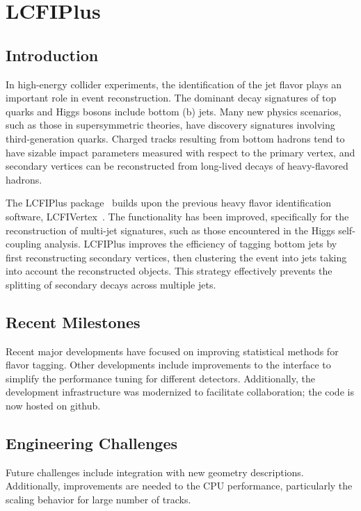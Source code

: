\section{LCFIPlus}

\subsection{Introduction}
In high-energy collider experiments, the identification of the jet flavor plays an important role in event reconstruction. The dominant decay signatures of top quarks and Higgs bosons include bottom (b) jets. Many new physics scenarios, such as those in supersymmetric theories, have discovery signatures involving third-generation quarks. Charged tracks resulting from bottom hadrons tend to have sizable impact parameters measured with respect to the primary vertex, and secondary vertices can be reconstructed from long-lived decays of heavy-flavored hadrons.

The LCFIPlus package~\cite{Suehara:2015ura} builds upon the previous heavy flavor identification software, LCFIVertex~\cite{Bailey:2009ui}. The functionality has been improved, specifically for the reconstruction of multi-jet signatures, such as those encountered in the Higgs self-coupling analysis. LCFIPlus improves the efficiency of tagging bottom jets by first reconstructing secondary vertices, then clustering the event into jets taking into account the reconstructed objects. This strategy effectively prevents the splitting of secondary decays across multiple jets.

\subsection{Recent Milestones}
Recent major developments have focused on improving statistical methods for flavor tagging. Other developments include improvements to the interface to simplify the performance tuning for different detectors.
Additionally, the development infrastructure was modernized to facilitate collaboration; the code is now hosted on github.

\subsection{Engineering Challenges}
Future challenges include integration with new geometry descriptions. Additionally, improvements are needed to the CPU performance, particularly the scaling behavior for large number of tracks.

